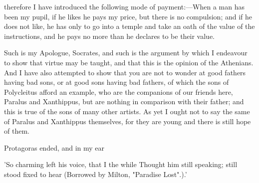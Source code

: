 \documentclass[11pt,letter]{article}
\begin{document}
therefore I have introduced the following mode of payment:—When a man has been my pupil, if he likes he pays my price, but there is no compulsion; and if he does not like, he has only to go into a temple and take an oath of the value of the instructions, and he pays no more than he declares to be their value.

\par  Such is my Apologue, Socrates, and such is the argument by which I endeavour to show that virtue may be taught, and that this is the opinion of the Athenians. And I have also attempted to show that you are not to wonder at good fathers having bad sons, or at good sons having bad fathers, of which the sons of Polycleitus afford an example, who are the companions of our friends here, Paralus and Xanthippus, but are nothing in comparison with their father; and this is true of the sons of many other artists. As yet I ought not to say the same of Paralus and Xanthippus themselves, for they are young and there is still hope of them.

\par  Protagoras ended, and in my ear

\par  'So charming left his voice, that I the while Thought him still speaking; still stood fixed to hear (Borrowed by Milton, "Paradise Lost".).'
\end{document}
